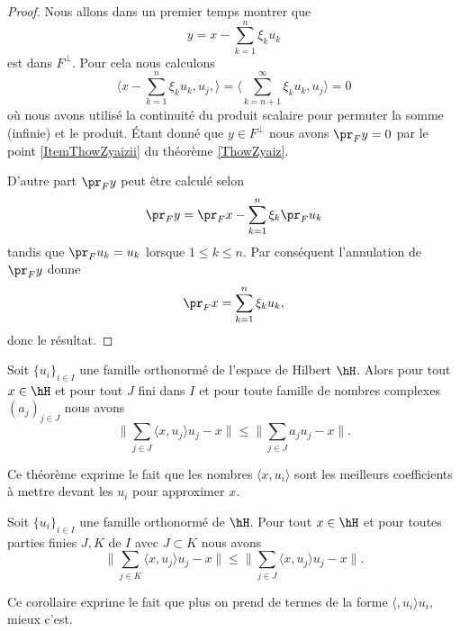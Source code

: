 \begin{proof}
    Nous allons dans un premier temps montrer que 
    \begin{equation}
        y=x-\sum_{k=1}^n\xi_ku_k
    \end{equation}
    est dans \( F^{\perp}\). Pour cela nous calculons
    \begin{equation}
        \langle x-\sum_{k=1}^n\xi_ku_k,u_j, \rangle =\langle \sum_{k=n+1}^{\infty}\xi_ku_k, u_j\rangle =0
    \end{equation}
    où nous avons utilisé la continuité du produit scalaire pour permuter la somme (infinie) et le produit. Étant donné que \( y\in F^{\perp}\) nous avons \( \pr_Fy=0\) par le point \ref{ItemThowZyaizii} du théorème \ref{ThowZyaiz}.

    D'autre part \( \pr_Fy\) peut être calculé selon
    \begin{equation}
        \pr_Fy=\pr_Fx-\sum_{k=1}^n\xi_k\pr_Fu_k
    \end{equation}
    tandis que \( \pr_Fu_k=u_k\) lorsque \( 1\leq k\leq n\). Par conséquent l'annulation de \( \pr_Fy\) donne
    \begin{equation}
        \pr_Fx=\sum_{k=1}^n\xi_ku_k,
    \end{equation}
    donc le résultat.
\end{proof}

\begin{theorem} \label{ThooRArDp}
    Soit \( \{ u_i \}_{i\in I}\) une famille orthonormé de l'espace de Hilbert \( \hH\). Alors pour tout \( x\in \hH\) et pour tout \( J\) fini dans \( I\) et pour toute famille de nombres complexes  \( (a_j)_{j\in J}\) nous avons
    \begin{equation}
        \| \sum_{j\in J}\langle x, u_j\rangle u_j-x \|\leq \| \sum_{j\in J}a_ju_j-x \|.
    \end{equation}
\end{theorem}
Ce théorème exprime le fait que les nombres \( \langle x, u_i\rangle \) sont les meilleurs coefficients à mettre devant les \( u_i\) pour approximer \( x\).

\begin{corollary}
    Soit \( \{ u_i \}_{i\in I}\) une famille orthonormé de \( \hH\). Pour tout \( x\in \hH\) et pour toutes parties finies \( J,K\) de \( I\) avec \( J\subset K\) nous avons
    \begin{equation}
        \| \sum_{j\in K}\langle x, u_j\rangle u_j-x \|\leq \| \sum_{j\in J}\langle x, u_j\rangle u_j-x \|.
    \end{equation}
\end{corollary}
Ce corollaire exprime le fait que plus on prend de termes de la forme \( \langle , u_i\rangle u_i\), mieux c'est.

